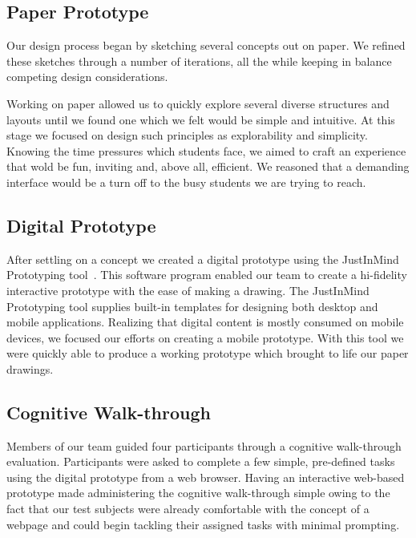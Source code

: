 \documentclass{sigchi-ext}
\begin{document}



\subsection{Paper Prototype}

Our design process began by sketching several concepts out on paper. We refined
these sketches through a number of iterations, all the while keeping in balance
competing design considerations.

Working on paper allowed us to quickly explore several diverse structures and
layouts until we found one which we felt would be simple and intuitive. At this
stage we focused on design such principles as explorability and simplicity.
Knowing the time pressures which students face, we aimed to craft an experience
that wold be fun, inviting and, above all, efficient. We reasoned that a
demanding interface would be a turn off to the busy students we are trying to
reach.


\subsection{Digital Prototype}

After settling on a concept we created a digital prototype using the JustInMind Prototyping
tool~\cite{justinmind}. This software program enabled our team to create a hi-fidelity interactive
prototype with the ease of making a drawing. The JustInMind Prototyping tool supplies built-in
templates for designing both desktop and mobile applications. Realizing that digital content is
mostly consumed on mobile devices, we focused our efforts on creating a mobile prototype. With this
tool we were quickly able to produce a working prototype which brought to life our paper drawings.


\subsection{Cognitive Walk-through}

Members of our team guided four participants through a cognitive walk-through
evaluation. Participants were asked to complete a few simple, pre-defined tasks
using the digital prototype from a web browser. Having an interactive
web-based prototype made administering the cognitive walk-through simple owing
to the fact that our test subjects were already comfortable with the concept of
a webpage and could begin tackling their assigned tasks with minimal prompting.
\end{document}
